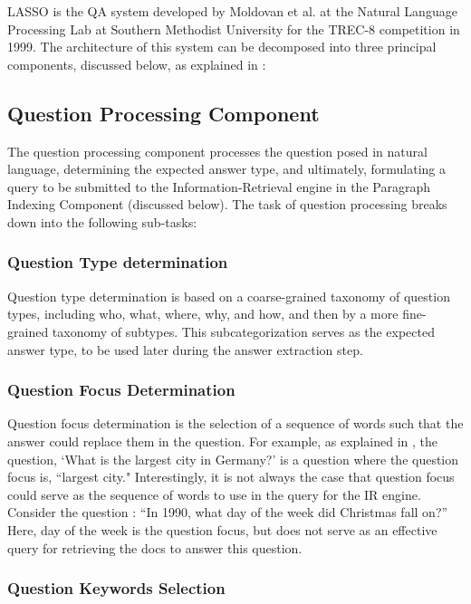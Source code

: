 LASSO \cite{moldovan_1999} is the QA system developed by Moldovan et al. at the Natural Language Processing Lab at Southern Methodist University for the TREC-8 competition in 1999.  The architecture of this system can be decomposed into three principal components, discussed below, as explained in \cite{moldovan_1999}:  

\subsection{Question Processing Component}

The question processing component processes the question posed in natural language, determining the expected answer type, and ultimately, formulating a query to be submitted to the Information-Retrieval engine in the Paragraph Indexing Component (discussed below).  The task of question processing breaks down into the following sub-tasks:

\subsubsection{Question Type determination}

Question type determination is based on a coarse-grained taxonomy of question types, including who, what, where, why, and how, and then by a more fine-grained taxonomy of subtypes.  This subcategorization serves as the expected answer type, to be used later during the answer extraction step.

\subsubsection{Question Focus Determination}

Question focus determination is the selection of a sequence of words such that the answer could replace them in the question.  For example, as explained in \cite{moldovan_1999}, the question, `What is the largest city in Germany?' is a question where the question focus is, ``largest city."  Interestingly, it is not always the case that question focus could serve as the sequence of words to use in the query for the IR engine.   Consider the question \cite{moldovan_1999}: ``In 1990, what day of the week did Christmas fall on?”  Here, day of the week is the question focus, but does not serve as an effective query for retrieving the docs to answer this question.  

\subsubsection{Question Keywords Selection}

